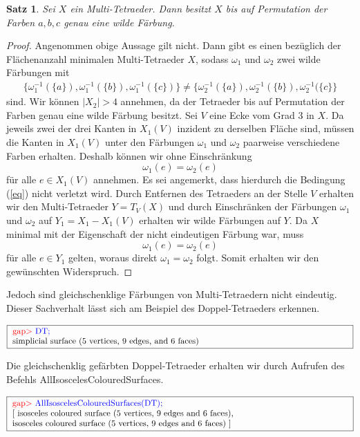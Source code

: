 \documentclass[12pt,titlepage,twoside,cleardoublepage]{article}
\theoremstyle{nummermitklammern}
\newtheorem{satz}[temp]{Satz}
\newtheorem{satz}[zahl]{Satz}
\numberwithin{equation}{section}
\begin{document}
\begin{satz}
Sei $X$ ein Multi-Tetraeder. Dann besitzt $X$ bis auf Permutation der Farben $a,b,c$ genau eine wilde Färbung.
\end{satz}
\begin{proof}
Angenommen obige Aussage gilt nicht. Dann gibt es einen bezüglich der Flächenanzahl minimalen Multi-Tetraeder $X$, sodass $\omega_1$ und $\omega_2$ zwei wilde Färbungen mit 
\begin{align} \label{eq}
\{\omega_1^{-1}(\{a\}),\omega_1^{-1}(\{b\}),\omega_1^{-1}(\{c\})\}\neq \{\omega_2^{-1}(\{a\}),\omega_2^{-1}(\{b\}),\omega_2^{-1}(\{c\}\}
\end{align}
sind. Wir können $\vert X_2\vert >4$ annehmen, da der Tetraeder bis auf Permutation der Farben genau eine wilde Färbung besitzt. Sei $V$ eine Ecke vom Grad 3 in $X.$ Da jeweils zwei der drei Kanten in $X_1(V)$ inzident zu derselben Fläche sind, müssen die Kanten in $X_1(V)$ unter den Färbungen $\omega_1$ und $\omega_2$ paarweise verschiedene Farben erhalten. Deshalb können wir ohne Einschränkung 
\[
\omega_1(e)=\omega_2(e)
\] 
für alle $e\in X_1(V)$ annehmen. Es sei angemerkt, dass hierdurch die Bedingung (\ref{eq}) nicht verletzt wird. Durch Entfernen des Tetraeders an der Stelle $V$ erhalten wir den Multi-Tetraeder $Y=T_V(X)$ und durch Einschränken der Färbungen $\omega_1$ und $\omega_2$ auf $Y_1=X_1-X_1(V)$ erhalten wir wilde Färbungen auf $Y$. Da $X$ minimal mit der Eigenschaft der nicht eindeutigen Färbung war, muss
\[
\omega_1(e)=\omega_2(e)
\]
für alle $e\in Y_1$ gelten, woraus direkt $\omega_1=\omega_2$ folgt. Somit erhalten wir den gewünschten Widerspruch.
\end{proof}
Jedoch sind gleichschenklige Färbungen von Multi-Tetraedern nicht eindeutig. Dieser Sachverhalt lässt sich am Beispiel des Doppel-Tetraeders erkennen.
\begin{center}
$\fbox{
\parbox{14cm}{
\textcolor{red}{gap$>$} \textcolor{blue}{ DT;}\\
simplicial surface (5 vertices, 9 edges, and 6 faces)
}}$
\end{center}
Die gleichschenklig gefärbten Doppel-Tetraeder erhalten wir durch Aufrufen des Befehls 
\textsf{AllIsoscelesColouredSurfaces}.
\begin{center}
$\fbox{
\parbox{14cm}{
\textcolor{red}{gap$>$} \textcolor{blue}{AllIsoscelesColouredSurfaces(DT);}\newline
[ isosceles coloured surface (5 vertices, 9 edges and 6 faces),\newline
  isosceles coloured surface (5 vertices, 9 edges and 6 faces) ]
}}$
\end{center}
\end{document}

